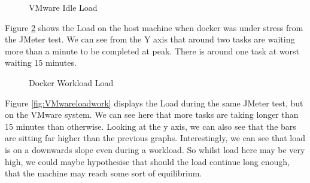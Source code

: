 \begin{figure}[H]
\caption{VMware Idle Load}
\label{fig:VMwareloadidle}
\centering
\end{figure}

Figure \ref{fig:Dockerloadwork} shows the Load on the host machine when docker was under stress from the JMeter test. We can see from the Y axis that around two tasks are waiting more than a minute to be completed at peak. There is around one task at worst waiting 15 minutes.

\begin{figure}[H]
\caption{Docker Workload Load}
\label{fig:Dockerloadwork}
\centering
\end{figure}

Figure \ref{fig:VMwareloadwork} displays the Load during the same JMeter test, but on the VMware system. We can see here that more tasks are taking longer than 15 minutes than otherwise. Looking at the y axis, we can also see that the bars are sitting far higher than the previous graphs. Interestingly, we can see that load is on a downwards slope even during a workload. So whilst load here may be very high, we could maybe hypothesise that should the load continue long enough, that the machine may reach some sort of equilibrium.

